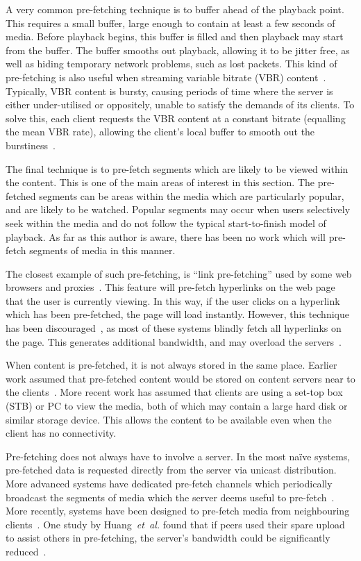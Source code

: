     A very common pre-fetching technique is to buffer ahead of the playback point. This requires a small buffer, large enough to contain at least a few seconds of media. Before playback begins, this buffer is filled and then playback may start from the buffer. The buffer smooths out playback, allowing it to be jitter free, as well as hiding temporary network problems, such as lost packets. This kind of pre-fetching is also useful when streaming variable bitrate (VBR) content~\cite{reisslein1997jsq}. Typically, VBR content is bursty, causing periods of time where the server is either under-utilised or oppositely, unable to satisfy the demands of its clients. To solve this, each client requests the VBR content at a constant bitrate (equalling the mean VBR rate), allowing the client's local buffer to smooth out the burstiness~\cite{bakiras1999sap}.

    The final technique is to pre-fetch segments which are likely to be viewed within the content. This is one of the main areas of interest in this section. The pre-fetched segments can be areas within the media which are particularly popular, and are likely to be watched. Popular segments may occur when users selectively seek within the media and do not follow the typical start-to-finish model of playback. As far as this author is aware, there has been no work which will pre-fetch segments of media in this manner.

    The closest example of such pre-fetching, is ``link pre-fetching'' used by some web browsers and proxies~\cite{chinen1997ipp}. This feature will pre-fetch hyperlinks on the web page that the user is currently viewing. In this way, if the user clicks on a hyperlink which has been pre-fetched, the page will load instantly. However, this technique has been discouraged~\cite{davison2001apg}, as most of these systems blindly fetch all hyperlinks on the page. This generates additional bandwidth, and may overload the servers~\cite{duchamp1999ph}.

    When content is pre-fetched, it is not always stored in the same place. Earlier work assumed that pre-fetched content would be stored on content servers near to the clients~\cite{sen99ppc,eager1999orc}. More recent work has assumed that clients are using a set-top box (STB) or PC to view the media, both of which may contain a large hard disk or similar storage device. This allows the content to be available even when the client has no connectivity.

    Pre-fetching does not always have to involve a server. In the most na\"{i}ve systems, pre-fetched data is requested directly from the server via unicast distribution. More advanced systems have dedicated pre-fetch channels which periodically broadcast the segments of media which the server deems useful to pre-fetch~\cite{chung2003evb}. More recently, systems have been designed to pre-fetch media from neighbouring clients~\cite{shen2006dps}. One study by Huang~\emph{et~al.} found that if peers used their spare upload to assist others in pre-fetching, the server's bandwidth could be significantly reduced~\cite{huang2007civ}.

